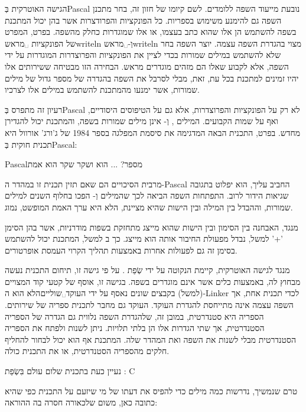 הגישה האוטרקית בְּPascal נובעת מייעוד השפה ללומדים. לשם קיומו של חזון זה, בחר מתכנן השפה גם להימנע משימוש בספריות. כל הפונקציות והפרודצרות אשר בהן יכול המתכנת בשפה להשתמש הן אלו שהוא כתב בעצמו, או אלו שמוגדרות כחלק מהשפה. בפרט, המפרט של הפונקציות ␣מראש{writeln} וְ-␣מראש{writeln} מצוי בהגדרת השפה עצמה. יוצר השפה בחר שלא להשתמש במילים שמורות בכדי לציין את הפונקציות והפרוצדרות המוגדרות על ידי השפה, אלא לקבוע שאלו הם מזהים מוגדרים מראש. הבחירה הזו מבטיחה ששירותים אלו יהיו זמינים למתכנת בכל עת, זאת, מבלי לסרבל את השפה בהגדרה של מספר גדול של מילים שמורות, אשר ימנעו מהמתכנת להשתמש במילים אלו לצרכיו.

רעיון זה מתפרס בְּPascal לא רק על הפונקציות והפרוצדרות, אלא גם על הטיפוסים
היסודיים, ואף על שמות הקבועים. המילים ,  וְ- אינן
מילים שמורות בשפה, והמתכנת יכול להגדירן מחדש. בפרט, התכנית הבאה המדגימה את
סיסמת המפלגה בספר 1984 של ג'ורג' אורוול היא תכנית חוקית בְּPascal:

{Pascal}{מספר? ... הוא ושקר שקר הוא אמת}

מרבית הסיכויים הם שאם תזין תכנית זו במהדר ה-Pascal החביב עליך, הוא יפלוט בתגובה
שגיאות הידור לרוב. התפתחות השפה הביאה לכך שהמילים  וְ- הפכו
בחלוף השנים למילים שמורות, וההבדל בין המילה  ובין הישות שהיא מציינת,
הלא היא ערך האמת המופשט, נמוג.

מנגד, האבחנה בין הסימון ובין הישות שהוא מייצג מתחזקת בשפות מודרניות, אשר בהן
הסימן '+' למשל, נבדל מפעולת החיבור אותה הוא מייצג. כך ב למשל, המתכנת
יכול להשתמש בסימן זה גם לפעולות אחרות באמצעות תהליך הקרוי העמסת אופרטורים.

מנגד לגישה האוטרקית, קיימת  הנקוטה על ידי שְׂפַת . על פי
גישה זו, תיחום התכנית נעשה מבחוץ לה, באמצעות כלים אשר אינם מוגדרים בשפה. בגישה
זו, אוסף של קטעי קוד המצויים (למשל) בקבצים שונים נאסף על ידי
העוקד␣שוליים{הלא הוא ה-Linker} לכדי תכנית אחת, אך השפה עצמה אינה מתייחסת
להגדרת העוקד. העוקד גם מחבר לתכנית ספריה של שירותים. הספריה היא סטנדרטית, במובן
זה, שלהגדרת השפה נלווית גם הגדרה של הספריה הסטנדרטית, אך שתי הגדרות אלו הן בלתי
תלויות. ניתן לשנות ולפתח את הספריה הסטנדרטית מבלי לשנות את השפה ואת המהדר שלה.
המתכנת אף הוא יכול לבחור להחליף חלקים מהספריה הסטנדרטית, או את התכנית כולה.

נעיין כעת בתכנית שלום עולם בִּשְׂפַת :
{C}

טרם שנמשיך, נדרשות כמה מילים כדי להפיס את דעתו של מי שיזעם על התכנית כפי שהיא כתובה כאן, משום שלכאורה חסרה בה ההוראה:
\setLTR{}

